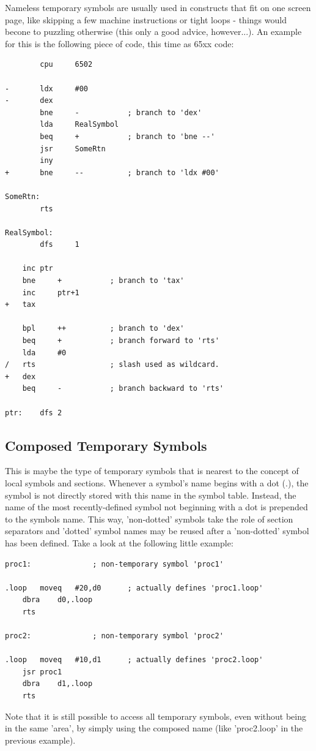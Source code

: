\documentclass[12pt,twoside]{report}
\begin{document}
Nameless temporary symbols are usually used in constructs that fit on one
screen page, like skipping a few machine instructions or tight loops -
things would becone to puzzling otherwise (this only a good advice,
however...).  An example for this is the following piece of code, this
time as 65xx code:
\begin{verbatim}
        cpu     6502

-       ldx     #00
-       dex
        bne     -           ; branch to 'dex'
        lda     RealSymbol
        beq     +           ; branch to 'bne --'
        jsr     SomeRtn
        iny
+       bne     --          ; branch to 'ldx #00'

SomeRtn:
        rts

RealSymbol:
        dfs     1

  	inc	ptr
   	bne 	+      	    ; branch to 'tax'
   	inc 	ptr+1
+ 	tax

 	bpl 	++     	    ; branch to 'dex'
   	beq 	+      	    ; branch forward to 'rts'
   	lda 	#0
/  	rts            	    ; slash used as wildcard.
+ 	dex
   	beq 	-           ; branch backward to 'rts'

ptr:	dfs	2
\end{verbatim}

\subsection{Composed Temporary Symbols}

This is maybe the type of temporary symbols that is nearest to the concept
of local symbols and sections.  Whenever a symbol's name begins with a dot
(.), the symbol is not directly stored with this name in the symbol table.
Instead, the name of the most recently-defined symbol not beginning with a
dot is prepended to the symbols name.  This way, 'non-dotted' symbols take
the role of section separators and 'dotted' symbol names may be reused
after a 'non-dotted' symbol has been defined.  Take a look at the
following little example:
\begin{verbatim}
proc1:				; non-temporary symbol 'proc1'

.loop	moveq	#20,d0		; actually defines 'proc1.loop'
	dbra	d0,.loop
	rts

proc2:				; non-temporary symbol 'proc2'

.loop	moveq	#10,d1		; actually defines 'proc2.loop'
	jsr	proc1
	dbra	d1,.loop
	rts
\end{verbatim}
Note that it is still possible to access all temporary symbols, even
without being in the same 'area', by simply using the composed name (like
'proc2.loop' in the previous example).
\end{document}
